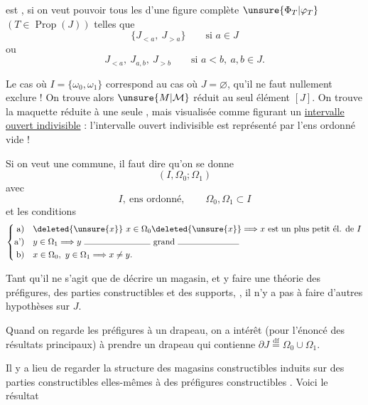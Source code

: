 
est , si on veut pouvoir  tous les \uline{} d'une figure complète $\unsure{\Phi_T|\varphi_T}$ $(T\in\operatorname{Prop}(J))$ telles que
\[
\{J_{<a},\ J_{>a}\}\qquad\text{si }a\in J
\]
ou
\[
J_{<a},\ J_{a,b},\ J_{>b}\qquad\text{si }a<b,\ a,b\in J.
\]

 Le cas où $I=\{\omega_0,\omega_1\}$ correspond au cas où $J=\varnothing$, qu'il ne faut nullement exclure ! On trouve alors $\unsure{M|\mathcal M}$ réduit au seul élément $[J]$. On trouve la maquette réduite à une seule , mais visualisée comme figurant un \uline{intervalle ouvert indivisible} : l'intervalle ouvert indivisible est représenté par l'ens ordonné vide !

Si on veut une  commune, il faut dire qu'on se donne
\[
(I,\Omega_0;\Omega_1)
\]
avec
\[
I,\ \text{ens ordonné},\qquad\Omega_0,\Omega_1\subset I
\]
et les conditions
\[
\left\{
\begin{aligned}
\text{a)}\quad&\deleted{\unsure{x}}\ x\in\Omega_0\deleted{\unsure{x}}\Longrightarrow x\text{ est un plus petit él. de }I\\
\text{a')}\quad&y\in\Omega_1\Longrightarrow y\ \text{\rule{2.7cm}{0.35pt}\ grand \rule{2.5cm}{0.35pt}}\\
\text{b)}\quad&x\in\Omega_0,\ y\in\Omega_1\Longrightarrow x\neq y.
\end{aligned}
\right.
\]


Tant qu'il ne s'agit que de décrire un magasin, et y faire une théorie des préfigures, des parties constructibles et des supports,  , il n'y a pas à faire d'autres hypothèses sur $J$.

Quand on regarde les préfigures  à un drapeau, on  a intérêt (pour l'énoncé des résultats principaux) à prendre un drapeau qui contienne $\partial J\overset{\mathrm{df}}=\Omega_0\cup\Omega_1$.

Il y a lieu de regarder la structure des magasins constructibles induits sur des parties constructibles  elles-mêmes à des préfigures constructibles \inserted{$\unsure{\Phi|\varphi}$}. Voici le résultat

